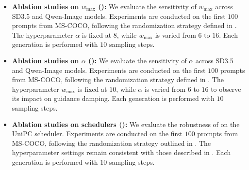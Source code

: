 \begin{itemize}

    \item \textbf{Ablation studies on $w_{\max}$ (): }
    We evaluate the sensitivity of $w_{\max}$ across SD3.5 and Qwen-Image models. Experiments are conducted on the first $100$ prompts from MS-COCO, following the randomization strategy defined in . The hyperparameter $\alpha$ is fixed at $8$, while $w_{\max}$ is varied from $6$ to $16$. Each generation is performed with $10$ sampling steps.

    \item \textbf{Ablation studies on $\alpha$ (): }
    We evaluate the sensitivity of $\alpha$ across SD3.5 and Qwen-Image models. Experiments are conducted on the first $100$ prompts from MS-COCO, following the randomization strategy defined in . The hyperparameter $w_{\max}$ is fixed at $10$, while $\alpha$ is varied from $6$ to $16$ to observe its impact on guidance damping. Each generation is performed with $10$ sampling steps.

    \item \textbf{Ablation studies on schedulers (): }
    We evaluate the robustness of \mtdbk on the UniPC scheduler. Experiments are conducted on the first $100$ prompts from MS-COCO, following the randomization strategy outlined in . The hyperparameter settings remain consistent with those described in . Each generation is performed with $10$ sampling steps.

\end{itemize}







